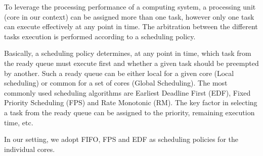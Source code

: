 To leverage the processing performance of a computing system, a processing unit (core in our context) can be assigned more than one task, however only one task can execute effectively at any point in time. The arbitration between the different tasks execution is performed according to a scheduling policy. 

Basically, a scheduling policy determines, at any point in time, which task from the ready queue must execute first and whether a given task should be preempted by another. Such a ready queue can be either local for a given core (Local scheduling) or common for a set of cores (Global Scheduling). The most commonly used scheduling algorithms are {Earliest Deadline First} (EDF), {Fixed Priority Scheduling} (FPS) and {Rate Monotonic} (RM). The key factor in selecting a task from the ready queue can be assigned to the priority, remaining execution time, etc. 
 
In our setting, we adopt FIFO, FPS and EDF as scheduling policies for the individual cores.  %